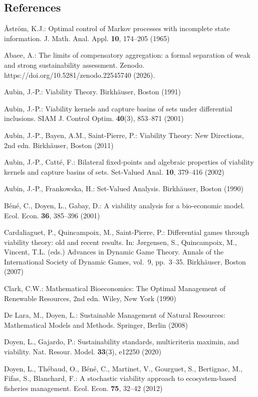 \documentclass[10pt,twocolumn]{article}
\theoremstyle{definition}
\begin{document}
\subsection{References}\label{references}
{\footnotesize

\r{A}str\"om, K.J.: Optimal control of Markov processes with incomplete state information. J. Math. Anal. Appl. \textbf{10}, 174--205 (1965)

Abaee, A.: The limits of compensatory aggregation: a formal separation of weak and strong sustainability assessment. Zenodo. https://doi.org/10.5281/zenodo.22545740 (2026).

Aubin, J.-P.: Viability Theory. Birkh\"auser, Boston (1991)

Aubin, J.-P.: Viability kernels and capture basins of sets under differential inclusions. SIAM J. Control Optim. \textbf{40}(3), 853--871 (2001)

Aubin, J.-P., Bayen, A.M., Saint-Pierre, P.: Viability Theory: New Directions, 2nd edn. Birkh\"auser, Boston (2011)

Aubin, J.-P., Catt\'e, F.: Bilateral fixed-points and algebraic properties of viability kernels and capture basins of sets. Set-Valued Anal. \textbf{10}, 379--416 (2002)

Aubin, J.-P., Frankowska, H.: Set-Valued Analysis. Birkh\"auser, Boston (1990)

B\'en\'e, C., Doyen, L., Gabay, D.: A viability analysis for a bio-economic
model. Ecol. Econ. \textbf{36}, 385--396 (2001)

Cardaliaguet, P., Quincampoix, M., Saint-Pierre, P.: Differential games
through viability theory: old and recent results. In: J\o{}rgensen, S.,
Quincampoix, M., Vincent, T.L. (eds.) Advances in Dynamic Game Theory.
Annals of the International Society of Dynamic Games, vol.~9, pp.~3--35.
Birkh\"auser, Boston (2007)

Clark, C.W.: Mathematical Bioeconomics: The Optimal Management of Renewable Resources, 2nd edn. Wiley, New York (1990)

De Lara, M., Doyen, L.: Sustainable Management of Natural Resources:
Mathematical Models and Methods. Springer, Berlin (2008)

Doyen, L., Gajardo, P.: Sustainability standards, multicriteria maximin,
and viability. Nat. Resour. Model. \textbf{33}(3), e12250 (2020)

Doyen, L., Th\'ebaud, O., B\'en\'e, C., Martinet, V., Gourguet, S., Bertignac,
M., Fifas, S., Blanchard, F.: A stochastic viability approach to
ecosystem-based fisheries management. Ecol. Econ. \textbf{75}, 32--42
(2012)

}
\end{document}

